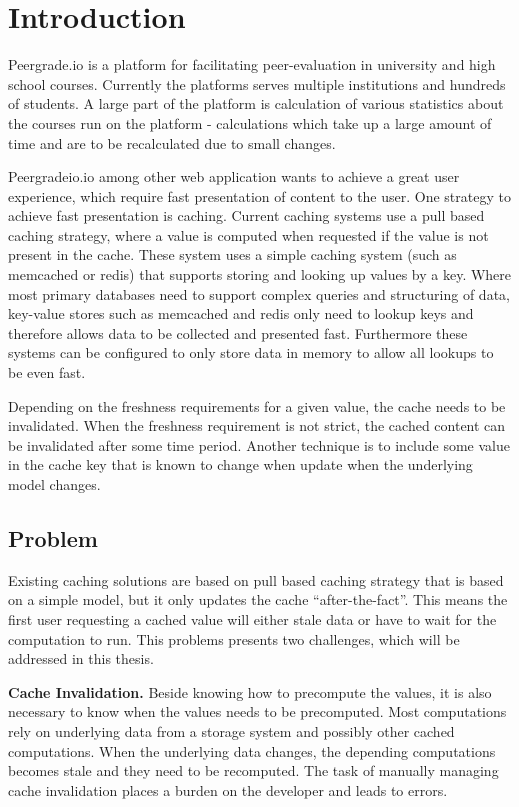 \chapter{Introduction}

Peergrade.io is a platform for facilitating peer-evaluation in university and high school courses. Currently the platforms serves multiple institutions and hundreds of students. A large part of the platform is calculation of various statistics about the courses run on the platform - calculations which take up a large amount of time and are to be recalculated due to small changes.

Peergradeio.io among other web application wants to achieve a great user experience, which require fast presentation of content to the user. One strategy to achieve fast presentation is caching. Current caching systems use a pull based caching strategy, where a value is computed when requested if the value is not present in the cache. These system uses a simple caching system (such as memcached or redis) that supports storing and looking up values by a key. Where most primary databases need to support complex queries and structuring of data, key-value stores such as memcached and redis only need to lookup keys and therefore allows data to be collected and presented fast. Furthermore these systems can be configured to only store data in memory to allow all lookups to be even fast.

Depending on the freshness requirements for a given value, the cache needs to be invalidated. When the freshness requirement is not strict, the cached content can be invalidated after some time period. Another technique is to include some value in the cache key that is known to change when update when the underlying model changes.

\section{Problem}
Existing caching solutions are based on pull based caching strategy that is based on a simple model, but it only updates the cache “after-the-fact”. This means the first user requesting a cached value will either stale data or have to wait for the computation to run. This problems presents two challenges, which will be addressed in this thesis.

\textbf{Cache Invalidation.} Beside knowing how to precompute the values, it is also necessary to know when the values needs to be precomputed. Most computations rely on underlying data from a storage system and possibly other cached computations. When the underlying data changes, the depending computations becomes stale and they need to be recomputed. The task of manually managing cache invalidation places a burden on the developer and leads to errors.

